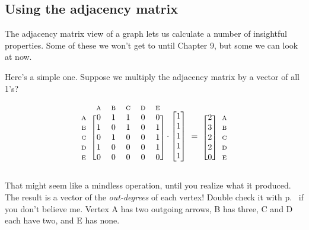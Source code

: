 \begin{alttitles}
\subsection{Using the adjacency matrix}

The adjacency matrix view of a graph lets us calculate a number of insightful
properties. Some of these we won't get to until Chapter 9, but some we can look
at now.


Here's a simple one. Suppose we multiply the adjacency matrix by a vector of
all 1's?

\[
\begin{blockarray}{cccccc}
& {\scriptsize\textrm{A}} & {\scriptsize\textrm{B}} & {\scriptsize\textrm{C}} & {\scriptsize\textrm{D}} & {\scriptsize\textrm{E}} \\
\begin{block}{c[ccccc]}
{\scriptsize\textrm{A}} & 0 & 1 & 1 & 0 & 0 \\
{\scriptsize\textrm{B}} & 1 & 0 & 1 & 0 & 1 \\
{\scriptsize\textrm{C}} & 0 & 1 & 0 & 0 & 1 \\
{\scriptsize\textrm{D}} & 1 & 0 & 0 & 0 & 1 \\
{\scriptsize\textrm{E}} & 0 & 0 & 0 & 0 & 0 \\
\end{block}
\end{blockarray} \cdot
\begin{bmatrix}
1 \\ 1 \\ 1 \\ 1 \\ 1 \\
\end{bmatrix} \ = \
\begin{blockarray}{cc}
\\
\begin{block}{[c]c}
2 & {\scriptsize\textrm{A}} \\
3 & {\scriptsize\textrm{B}} \\
2 & {\scriptsize\textrm{C}} \\
2 & {\scriptsize\textrm{D}} \\
0 & {\scriptsize\textrm{E}} \\
\end{block}
\end{blockarray}
\]


That might seem like a mindless operation, until you realize what it produced.
The result is a vector of the \textit{out-degrees} of each vertex! Double
check it with p.~\pageref{fig:directedGraph} if you don't believe me. Vertex A
has two outgoing arrows, B has three, C and D each have two, and E has none.


\end{alttitles}
